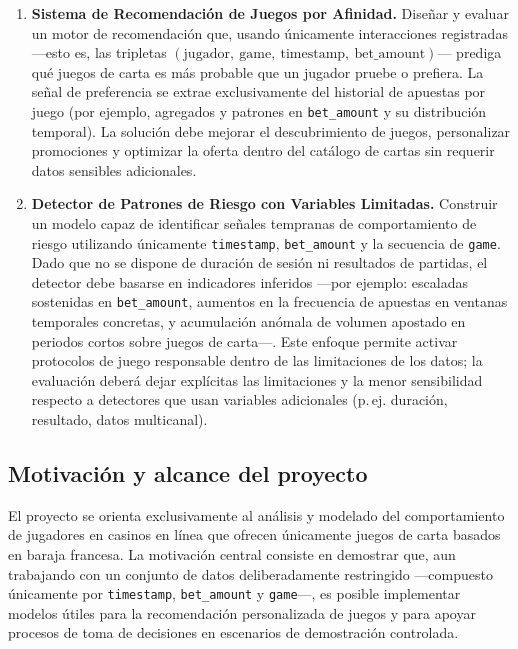 \documentclass[12pt,a4paper]{article}
\begin{document}
\begin{enumerate}[leftmargin=*]
      \item \textbf{Sistema de Recomendación de Juegos por Afinidad.} Diseñar y evaluar un motor de recomendación que, usando únicamente interacciones registradas —esto es, las tripletas \((\text{jugador},\ \text{game},\ \text{timestamp},\ \text{bet\_amount})\)— prediga qué juegos de carta es más probable que un jugador pruebe o prefiera. La señal de preferencia se extrae exclusivamente del historial de apuestas por juego (por ejemplo, agregados y patrones en \texttt{bet\_amount} y su distribución temporal). La solución debe mejorar el descubrimiento de juegos, personalizar promociones y optimizar la oferta dentro del catálogo de cartas sin requerir datos sensibles adicionales.
  \item \textbf{Detector de Patrones de Riesgo con Variables Limitadas.} Construir un modelo capaz de identificar señales tempranas de comportamiento de riesgo utilizando únicamente \texttt{timestamp}, \texttt{bet\_amount} y la secuencia de \texttt{game}. Dado que no se dispone de duración de sesión ni resultados de partidas, el detector debe basarse en indicadores inferidos ---por ejemplo: escaladas sostenidas en \texttt{bet\_amount}, aumentos en la frecuencia de apuestas en ventanas temporales concretas, y acumulación anómala de volumen apostado en periodos cortos sobre juegos de carta---. Este enfoque permite activar protocolos de juego responsable dentro de las limitaciones de los datos; la evaluación deberá dejar explícitas las limitaciones y la menor sensibilidad respecto a detectores que usan variables adicionales (p.\,ej. duración, resultado, datos multicanal).
\end{enumerate}


\subsection{Motivación y alcance del proyecto}
El proyecto se orienta exclusivamente al análisis y modelado del comportamiento de jugadores en casinos en línea que ofrecen únicamente juegos de carta basados en baraja francesa. La motivación central consiste en demostrar que, aun trabajando con un conjunto de datos deliberadamente restringido ---compuesto únicamente por \texttt{timestamp}, \texttt{bet\_amount} y \texttt{game}---, es posible implementar modelos útiles para la recomendación personalizada de juegos y para apoyar procesos de toma de decisiones en escenarios de demostración controlada.
\end{document}
